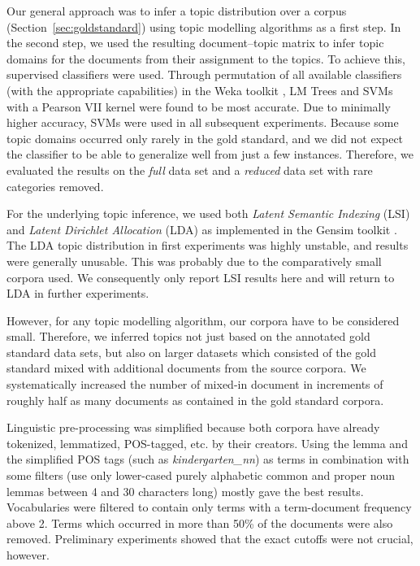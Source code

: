 \documentclass[11pt]{article}
\begin{document}
Our general approach was to infer a topic distribution over a corpus (Section~\ref{sec:goldstandard}) using topic modelling algorithms as a first step.
In the second step, we used the resulting document--topic matrix to infer topic domains for the documents from their assignment to the topics.
To achieve this, supervised classifiers were used.
Through permutation of all available classifiers (with the appropriate capabilities) in the Weka toolkit \cite{HallWitten2011}, LM Trees \cite{LandwehrEa2005} and SVMs with a Pearson VII kernel \cite{UstunEa2006} were found to be most accurate.
Due to minimally higher accuracy, SVMs were used in all subsequent experiments.
Because some topic domains occurred only rarely in the gold standard, and we did not expect the classifier to be able to generalize well from just a few instances.
Therefore, we evaluated the results on the \textit{full} data set and a \textit{reduced} data set with rare categories removed.

For the underlying topic inference, we used both \textit{Latent Semantic Indexing} (LSI) \cite{LandauerDumais1994,LSAHandbook} and \textit{Latent Dirichlet Allocation} (LDA) \cite{BleiEa2003} as implemented in the Gensim toolkit \cite{RehurekSojka2010}.
The LDA topic distribution in first experiments was highly unstable, and results were generally unusable.
This was probably due to the comparatively small corpora used.
We consequently only report LSI results here and will return to LDA in further experiments.

However, for any topic modelling algorithm, our corpora have to be considered small.
Therefore, we inferred topics not just based on the annotated gold standard data sets, but also on larger datasets which consisted of the gold standard mixed with additional documents from the source corpora.
We systematically increased the number of mixed-in document in increments of roughly half as many documents as contained in the gold standard corpora.

Linguistic pre-processing was simplified because both corpora have already tokenized, lemmatized, POS-tagged, etc. by their creators.
Using the lemma and the simplified POS tags (such as \textit{kindergarten\_nn}) as terms in combination with some filters (use only lower-cased purely alphabetic common and proper noun lemmas between 4 and 30 characters long) mostly gave the best results.
Vocabularies were filtered to contain only terms with a term-document frequency above 2.
Terms which occurred in more than 50\% of the documents were also removed.
Preliminary experiments showed that the exact cutoffs were not crucial, however.
\end{document}
